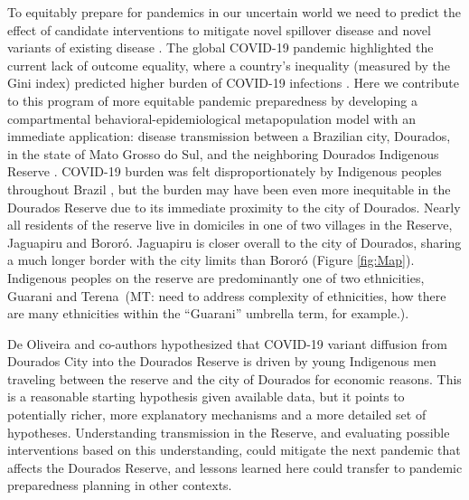 \documentclass[
  letterpaper,
  abstract]{scrartcl}
\newcommand{\mt}[1]{{\textcolor{myorange} {({\tiny MT:} #1)}}}
\begin{document}
To equitably prepare for pandemics in our uncertain world we
need to predict the effect of candidate interventions to mitigate novel spillover
disease and novel variants of existing disease
\autocite{Rodo2021,Adashi2022}. The global COVID-19 pandemic highlighted
the current lack of outcome equality, where a country's inequality
(measured by the Gini index) predicted higher burden of COVID-19
infections \autocite{Su2022}. Here we contribute to this program of more
equitable pandemic preparedness by developing a compartmental
behavioral-epidemiological metapopulation model with an immediate application:
disease transmission between a Brazilian city, Dourados, in the state of 
Mato Grosso do Sul, and the
neighboring Dourados Indigenous Reserve \autocite{DeOliveira2023}.
COVID-19 burden was felt disproportionately by Indigenous peoples throughout
Brazil \autocite{Simionatto2020}, but the burden may have been even more 
inequitable in the
Dourados Reserve due to its immediate proximity to the city of Dourados. Nearly
all residents of the reserve live in domiciles in one of two villages in
the Reserve, Jaguapiru and Bororó. Jaguapiru is closer overall to the
city of Dourados, sharing a much longer border with the city limits than
Bororó (Figure \ref{fig:Map}). Indigenous peoples on the reserve are predominantly
one of two ethnicities, Guarani and Terena~\mt{need to address complexity of ethnicities,
how there are many ethnicities within the ``Guarani'' umbrella term, for example.}. 

De Oliveira and co-authors hypothesized that COVID-19 variant diffusion
from Dourados City into the Dourados Reserve is driven by young
Indigenous men traveling between the reserve and the city of Dourados
for economic reasons. This is a reasonable starting hypothesis given available
data, but it points to potentially richer, more explanatory mechanisms and 
a more detailed set of hypotheses. Understanding transmission in the Reserve, and
evaluating possible interventions based on this understanding, could mitigate
the next pandemic that affects the Dourados Reserve, and lessons learned here could
transfer to pandemic preparedness planning in other contexts.
\end{document}
